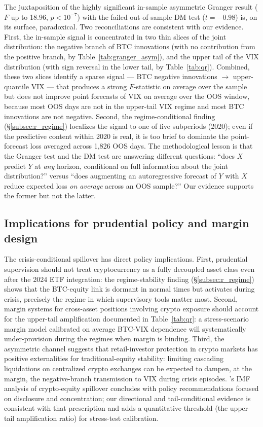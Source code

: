 \documentclass[11pt,a4paper]{article}
\begin{document}
The juxtaposition of the highly significant in-sample asymmetric Granger result ($F$ up to 18.96, $p < 10^{-7}$) with the failed out-of-sample DM test ($t = -0.98$) is, on its surface, paradoxical. Two reconciliations are consistent with our evidence. First, the in-sample signal is concentrated in two thin slices of the joint distribution: the negative branch of BTC innovations (with no contribution from the positive branch, by Table~\ref{tab:granger_asym}), and the upper tail of the VIX distribution (with sign reversal in the lower tail, by Table~\ref{tab:qr}). Combined, these two slices identify a sparse signal --- BTC negative innovations $\to$ upper-quantile VIX --- that produces a strong $F$-statistic on average over the sample but does not improve point forecasts of VIX on average over the OOS window, because most OOS days are not in the upper-tail VIX regime and most BTC innovations are not negative. Second, the regime-conditional finding (\S\ref{subsec:r_regime}) localizes the signal to one of five subperiods (2020); even if the predictive content within 2020 is real, it is too brief to dominate the point-forecast loss averaged across 1{,}826 OOS days. The methodological lesson is that the Granger test and the DM test are answering different questions: ``does $X$ predict $Y$ at \emph{any} horizon, conditional on full information about the joint distribution?'' versus ``does augmenting an autoregressive forecast of $Y$ with $X$ reduce expected loss \emph{on average} across an OOS sample?'' Our evidence supports the former but not the latter.

\subsection{Implications for prudential policy and margin design}
\label{subsec:d_policy}

The crisis-conditional spillover has direct policy implications. First, prudential supervision should not treat cryptocurrency as a fully decoupled asset class even after the 2024 ETF integration: the regime-stability finding (\S\ref{subsec:r_regime}) shows that the BTC-equity link is dormant in normal times but activates during crisis, precisely the regime in which supervisory tools matter most. Second, margin systems for cross-asset positions involving crypto exposure should account for the upper-tail amplification documented in Table~\ref{tab:qr}: a stress-scenario margin model calibrated on average BTC-VIX dependence will systematically under-provision during the regimes when margin is binding. Third, the asymmetric channel suggests that retail-investor protection in crypto markets has positive externalities for traditional-equity stability: limiting cascading liquidations on centralized crypto exchanges can be expected to dampen, at the margin, the negative-branch transmission to VIX during crisis episodes. \citet{iyer2022}'s IMF analysis of crypto-equity spillover concludes with policy recommendations focused on disclosure and concentration; our directional and tail-conditional evidence is consistent with that prescription and adds a quantitative threshold (the upper-tail amplification ratio) for stress-test calibration.
\end{document}
